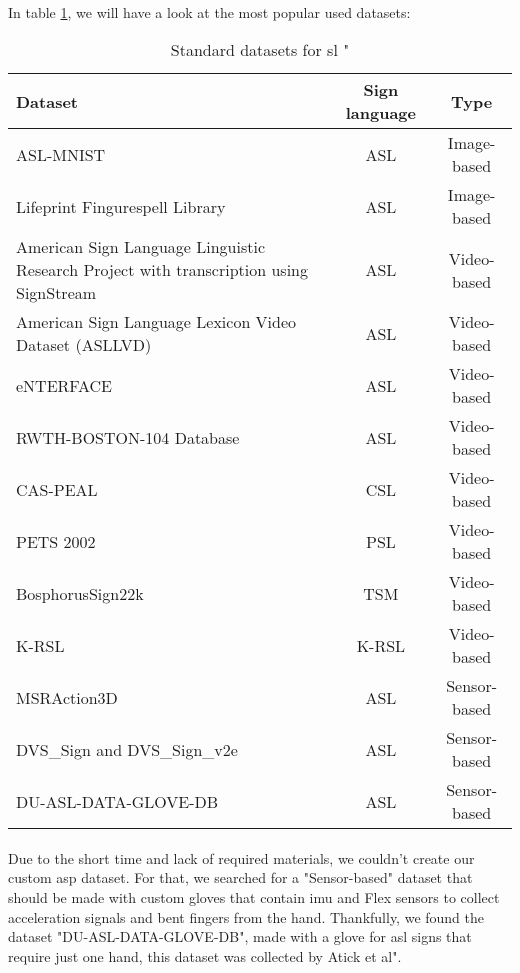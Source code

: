 \paragraph{}
In table \ref{tab:standard-datasets}, we will have a look at the most popular used datasets:
\begin{table}[h]
	\centering
	\caption{Standard datasets for \ac{sl} "\cite{state_of_the_art, ref-article, fingerspelling, wu2018american, baker2010sign, lu2008database, starner1995real, li2011framework}}
	\label{tab:standard-datasets}
	\begin{tabular}{|p{}|c|c|}
		\hline
		Dataset & Sign language & Type \\
		\hline
		ASL-MNIST & ASL & Image-based \\
		\hline
		Lifeprint Fingurespell Library & ASL & Image-based \\
		\hline
		American Sign Language Linguistic Research Project with transcription using SignStream & ASL & Video-based \\
		\hline
		American Sign Language Lexicon Video Dataset (ASLLVD) & ASL & Video-based \\
		\hline
		eNTERFACE & ASL & Video-based \\
		\hline
		RWTH-BOSTON-104 Database & ASL & Video-based \\
		\hline
		CAS-PEAL & CSL & Video-based \\
		\hline
		PETS 2002 & PSL & Video-based \\
		\hline
		BosphorusSign22k & TSM & Video-based \\
		\hline
		K-RSL & K-RSL & Video-based \\
		\hline
		MSRAction3D & ASL & Sensor-based \\
		\hline
		DVS\_Sign and DVS\_Sign\_v2e & ASL & Sensor-based \\
		\hline
		DU-ASL-DATA-GLOVE-DB & ASL & Sensor-based \\
		\hline
	\end{tabular}
\end{table}
\paragraph{}
Due to the short time and lack of required materials, we couldn't create our custom \ac{asp} dataset. For that, we searched for a "Sensor-based" dataset that should be made with custom gloves that contain \ac{imu} and Flex sensors to collect acceleration signals and bent fingers from the hand. Thankfully, we found the dataset "DU-ASL-DATA-GLOVE-DB", made with a glove for \ac{asl} signs that require just one hand, this dataset was collected by Atick et al"\cite{ref-article}.